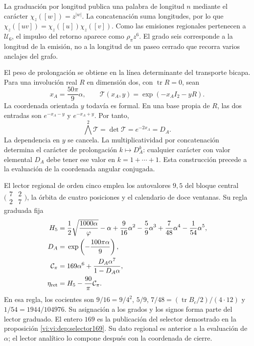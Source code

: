 La graduación por longitud publica una palabra de longitud \(n\)
mediante el carácter \(\chi_z([w])=z^{|w|}\). La concatenación
suma longitudes, por lo que
\(\chi_z([uv])=\chi_z([u])\chi_z([v])\). Como las emisiones
regionales pertenecen a \(\mathcal U_6\), el impulso del retorno
aparece como \(\rho_\pi z^6\). El grado seis corresponde a la
longitud de la emisión, no a la longitud de un paseo cerrado que
recorra varios anclajes del grafo.

El peso de prolongación se obtiene en la línea determinante del
transporte bicapa. Para una involución real \(R\) en dimensión dos,
con \(\operatorname{tr}R=0\), sean
\[
 x_A=\frac{50\pi}{9}\alpha,\qquad
 \mathcal T(x_A,y)=\exp(-x_AI_2-yR).
\]
La coordenada orientada \(y\) todavía es formal. En una base propia
de \(R\), las dos entradas son \(e^{-x_A-y}\) y
\(e^{-x_A+y}\). Por tanto,
\[
 \bigwedge^2\mathcal T=\det\mathcal T
 =e^{-2x_A}=D_A.
\]
La dependencia en \(y\) se cancela. La multiplicatividad por
concatenación determina el carácter de prolongación \(k\mapsto D_A^k\):
cualquier carácter con valor elemental \(D_A\) debe tener ese valor
en \(k=1+\cdots+1\). Esta construcción precede a la evaluación
de la coordenada angular conjugada.

El lector regional de orden cinco emplea los autovalores \(9,5\)
del bloque central \(\bigl(\begin{smallmatrix}7&2\\2&7\end{smallmatrix}\bigr)\),
la órbita de cuatro posiciones y el calendario de doce ventanas.
Su regla graduada fija
\begin{align}
 H_5={}&\frac12\sqrt{\frac{1000\alpha}{\varphi}}-\alpha
       +\frac9{16}\alpha^2-\frac59\alpha^3
       +\frac7{48}\alpha^4-\frac1{54}\alpha^5,\notag\\
 D_A={}&\exp\left(-\frac{100\pi\alpha}{9}\right),\notag\\
 \mathcal C_\pi={}&169\alpha^6+
                  \frac{D_A\alpha^7}{1-D_A\alpha},\notag\\
 \eta_{\rm ret}={}&H_5-\frac{90}{\pi}\mathcal C_\pi.
 \label{vi:vi:dep:mantisas}
\end{align}
En esa regla, los cocientes son
\(9/16=9/4^2\), \(5/9\), \(7/48=(\operatorname{tr}B_c/2)/(4\cdot12)\)
y \(1/54=1944/104976\). Su asignación a los grados y los signos
forma parte del lector graduado. El entero \(169\) es la publicación
del selector demostrado en la proposición \ref{vi:vi:dep:selector169}.
Su dato regional es anterior a la evaluación de \(\alpha\); el
lector analítico lo compone después con la coordenada de cierre.

